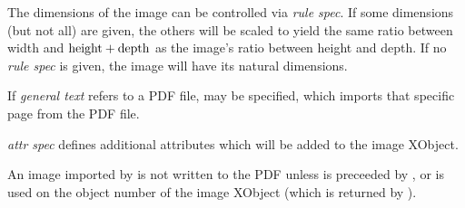 The dimensions of the image can be controlled via {\it rule spec}.
If some dimensions (but not all) are given, the others will be scaled to yield the same ratio between
width and ${\rm height}+{\rm depth}$ as the image's ratio between height and depth.
If no {\it rule spec} is given, the image will have its natural dimensions.

If {\it general text} refers to a PDF file,  may be specified, which imports
that specific page from the PDF file.

{\it attr spec} defines additional attributes which will be added to the image XObject.

An image imported by \macro\pdfximage{} is not written to the PDF unless \macro\pdfximage{} is preceeded by
\macro\immediate, or \macro\pdfrefximage{} is used on the object number of the image XObject (which is
returned by \macro\pdflastximage).

